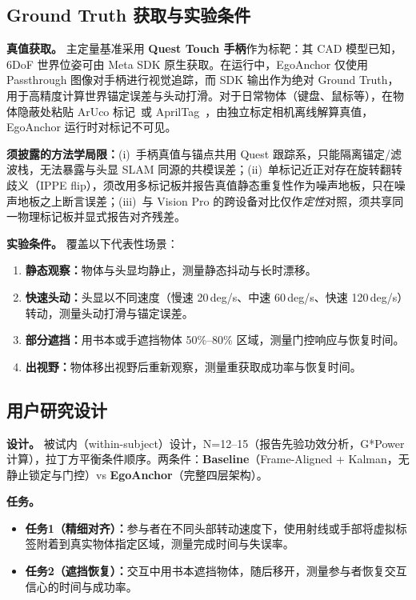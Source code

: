 \documentclass[review]{vgtc}
\begin{document}
\subsection{Ground Truth 获取与实验条件}

\noindent\textbf{真值获取。} 主定量基准采用 \textbf{Quest Touch 手柄}作为标靶：其 CAD 模型已知，6DoF 世界位姿可由 Meta SDK 原生获取。在运行中，EgoAnchor 仅使用 Passthrough 图像对手柄进行视觉追踪，而 SDK 输出作为绝对 Ground Truth，用于高精度计算世界锚定误差与头动打滑。对于日常物体（键盘、鼠标等），在物体隐蔽处粘贴 ArUco 标记~\cite{garridojurado2014aruco}或 AprilTag~\cite{olson2011apriltag}，由独立标定相机离线解算真值，EgoAnchor 运行时对标记不可见。

\noindent\textbf{须披露的方法学局限：}(i)~手柄真值与锚点共用 Quest 跟踪系，只能隔离锚定/滤波栈，无法暴露与头显 SLAM 同源的共模误差；(ii)~单标记近正对存在旋转翻转歧义（IPPE flip），须改用多标记板并报告真值静态重复性作为噪声地板，只在噪声地板之上断言误差；(iii)~与 Vision Pro 的跨设备对比仅作\emph{定性}对照，须共享同一物理标记板并显式报告对齐残差。

\noindent\textbf{实验条件。} 覆盖以下代表性场景：
\begin{enumerate}[leftmargin=1.4em]
  \item \textbf{静态观察：}物体与头显均静止，测量静态抖动与长时漂移。
  \item \textbf{快速头动：}头显以不同速度（慢速 20\,deg/s、中速 60\,deg/s、快速 120\,deg/s）转动，测量头动打滑与锚定误差。
  \item \textbf{部分遮挡：}用书本或手遮挡物体 50\%--80\% 区域，测量门控响应与恢复时间。
  \item \textbf{出视野：}物体移出视野后重新观察，测量重获取成功率与恢复时间。
\end{enumerate}

\subsection{用户研究设计}

\noindent\textbf{设计。} 被试内（within-subject）设计，N=12--15（报告先验功效分析，G*Power 计算），拉丁方平衡条件顺序。两条件：\textbf{Baseline}（Frame-Aligned + Kalman，无静止锁定与门控）vs \textbf{EgoAnchor}（完整四层架构）。

\noindent\textbf{任务。}
\begin{itemize}[leftmargin=1.4em]
  \item \textbf{任务1（精细对齐）：}参与者在不同头部转动速度下，使用射线或手部将虚拟标签附着到真实物体指定区域，测量完成时间与失误率。
  \item \textbf{任务2（遮挡恢复）：}交互中用书本遮挡物体，随后移开，测量参与者恢复交互信心的时间与成功率。
\end{itemize}
\end{document}
